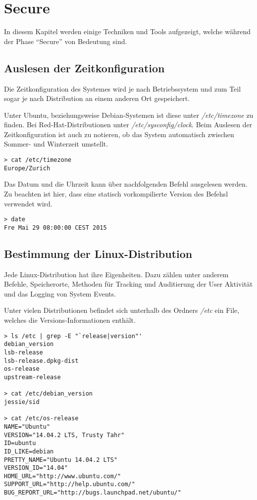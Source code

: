 \section{Secure}
In diesem Kapitel werden einige Techniken und Tools aufgezeigt, welche während der Phase "`Secure"' von Bedeutung sind. 


\subsection{Auslesen der Zeitkonfiguration}
Die Zeitkonfiguration des Systemes wird je nach Betriebssystem und zum Teil sogar je nach Distribution an einem anderen Ort gespeichert.

Unter Ubuntu, beziehungsweise Debian-Systemen ist diese unter \textit{/etc/timezone} zu finden. Bei Red-Hat-Distributionen unter \textit{/etc/sysconfig/clock}.
Beim Auslesen der Zeitkonfiguration ist auch zu notieren, ob das System automatisch zwischen Sommer- und Winterzeit umstellt.

\begin{lstlisting}
> cat /etc/timezone
Europe/Zurich
\end{lstlisting}

Das Datum und die Uhrzeit kann über nachfolgenden Befehl ausgelesen werden. Zu beachten ist hier, dass eine statisch vorkompilierte Version des Befehsl verwendet wird.
\begin{lstlisting}
> date
Fre Mai 29 08:00:00 CEST 2015
\end{lstlisting}


\subsection{Bestimmung der Linux-Distribution}
Jede Linux-Distribution hat ihre Eigenheiten. Dazu zählen unter anderem Befehle, Speicherorte, Methoden für Tracking und Auditierung der User Aktivität und das Logging von System Events.

Unter vielen Distributionen befindet sich unterhalb des Ordners \textit{/etc} ein File, welches die Versions-Informationen enthält.\\
\begin{lstlisting}
> ls /etc | grep -E "`release|version"'
debian_version
lsb-release
lsb-release.dpkg-dist
os-release
upstream-release

> cat /etc/debian_version
jessie/sid

> cat /etc/os-release
NAME="Ubuntu"
VERSION="14.04.2 LTS, Trusty Tahr"
ID=ubuntu
ID_LIKE=debian
PRETTY_NAME="Ubuntu 14.04.2 LTS"
VERSION_ID="14.04"
HOME_URL="http://www.ubuntu.com/"
SUPPORT_URL="http://help.ubuntu.com/"
BUG_REPORT_URL="http://bugs.launchpad.net/ubuntu/"
\end{lstlisting}


